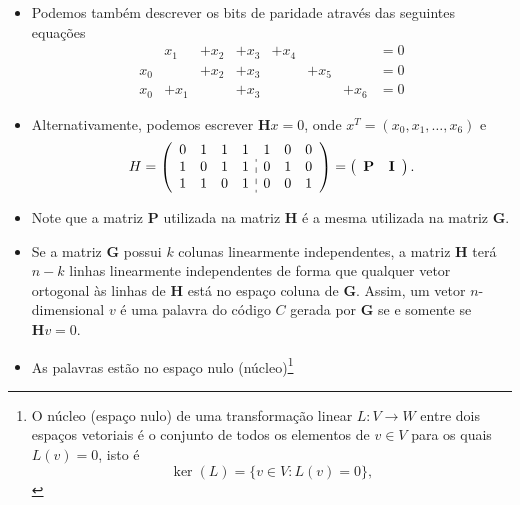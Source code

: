 \begin{frame}[allowframebreaks]
\begin{itemize}
  \item Podemos também descrever os bits de paridade através das seguintes equações
	\begin{equation}
	\begin{matrix}
	    &   x_1 & + x_2 & + x_3 & + x_4 &       &       & = 0 \\
	x_0 &       & + x_2 & + x_3 &       & + x_5 &       & = 0 \\
	x_0 & + x_1 &       & + x_3 &       &       & + x_6 & = 0 
	\end{matrix}
 	\end{equation}
  \item Alternativamente, podemos escrever $\mathbf{H}x = 0$, onde $x^{T} = (x_0, x_1, \ldots, x_6)$ e
	\begin{equation}
	H = 
  \left(
    \begin{array}{cccc:ccc}
    0 & 1 & 1 & 1 & 1 & 0 & 0 \\
	  1 & 0 & 1 & 1 & 0 & 1 & 0 \\
	  1 & 1 & 0 & 1 & 0 & 0 & 1 
    \end{array}
  \right) = \left( \begin{array}{c:c} \mathbf{P} & \mathbf{I} \end{array} \right).
	\end{equation}
  \item Note que a matriz $\mathbf{P}$ utilizada na matriz $\mathbf{H}$ é a mesma utilizada na matriz $\mathbf{G}$.
  \item Se a matriz $\mathbf{G}$ possui $k$ colunas linearmente independentes, a matriz $\mathbf{H}$ terá $n-k$ linhas linearmente independentes de forma que
    qualquer vetor ortogonal às linhas de $\mathbf{H}$ está no espaço coluna de $\mathbf{G}$. Assim, um vetor $n$-dimensional $v$ é uma palavra do código $C$
    gerada por $\mathbf{G}$ se e somente se $\mathbf{H} v = 0$.
  \item As palavras estão no espaço nulo (núcleo)\footnote{
	O núcleo (espaço nulo) de uma transformação linear $L: V \rightarrow W$ entre dois espaços vetoriais é o conjunto
	de todos os elementos de $v \in V$  para os quais $L(v) = 0$, isto é
	\begin{equation}
	\ker(L) = \{ v \in V : L(v) = 0 \},
	\end{equation}
}
\end{itemize}
\end{frame}
